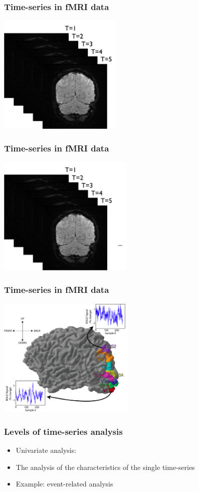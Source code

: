 \documentclass{beamer}
\begin{document}
\begin{frame}
\frametitle{Time-series in fMRI data}
\includegraphics[height=5.7cm]{figures/t1_2_3_4_5}
\end{frame}

\begin{frame}
\frametitle{Time-series in fMRI data}
\includegraphics[height=5.7cm]{figures/t1_5_etc}
\end{frame}

\begin{frame}
\frametitle{Time-series in fMRI data}
\includegraphics[height=5.7cm]{figures/brain_w_tseries}
\end{frame}


\begin{frame}
\frametitle{Levels of time-series analysis}
\begin{itemize}
\pause
\item
Univariate analysis: 
\pause
\item 
The analysis of the characteristics of the single time-series
\pause
\item
Example: event-related analysis
\end{itemize}
\end{frame}
\end{document}
